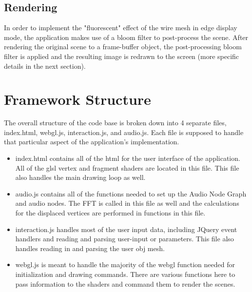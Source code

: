 \documentclass[12pt]{article}
\begin{document}
\subsection{Rendering}
In order to implement the "fluorescent" effect of the wire mesh in edge display mode, the application makes use of a bloom filter to post-process the scene. After rendering the original scene to a frame-buffer object, the post-processing bloom filter is applied and the resulting image is redrawn to the screen (more specific details in the next section).

\section{Framework Structure}
The overall structure of the code base is broken down into 4 separate files, index.html, webgl.js, interaction.js, and audio.js. Each file is supposed to handle that particular aspect of the application's implementation.
\begin{itemize}
	\item index.html contains all of the html for the user interface of the application. All of the glsl vertex and fragment shaders are located in this file. This file also handles the main drawing loop as well.

	\item audio.js contains all of the functions needed to set up the Audio Node Graph and audio nodes. The FFT is called in this file as well and the calculations for the displaced vertices are performed in functions in this file.

	\item interaction.js handles most of the user input data, including JQuery event handlers and reading and parsing user-input or parameters. This file also handles reading in and parsing the user obj mesh.

	\item webgl.js is meant to handle the majority of the webgl function needed for initialization and drawing commands. There are various functions here to pass information to the shaders and command them to render the scenes.
\end{itemize}
\end{document}
